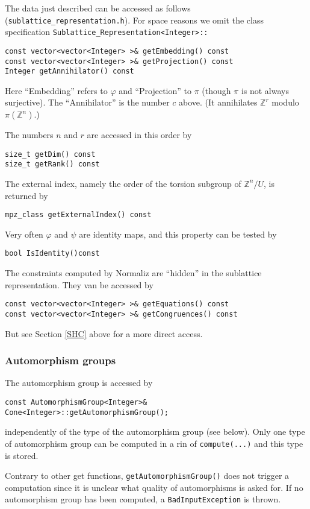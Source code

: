 \documentclass[12pt,a4paper]{scrartcl}
\theoremstyle{definition}
\let\phi=\varphi
\def\ZZ{{\mathbb Z}}
\begin{document}
\begin{small}
The data just described can be accessed as follows (\verb|sublattice_representation.h|). For space reasons we omit the class specification \verb|Sublattice_Representation<Integer>::|
\begin{Verbatim}
const vector<vector<Integer> >& getEmbedding() const
const vector<vector<Integer> >& getProjection() const
Integer getAnnihilator() const
\end{Verbatim}
Here ``Embedding'' refers to $\phi$ and ``Projection'' to $\pi$ (though $\pi$ is not always surjective). The ``Annihilator'' is the number $c$ above. (It annihilates $\ZZ^r$ modulo $\pi(\ZZ^n)$.)

The numbers $n$ and $r$ are accessed in this order by
\begin{Verbatim}
size_t getDim() const
size_t getRank() const
\end{Verbatim}
The external index, namely the order of the torsion subgroup of $\ZZ^n/U$, is returned by
\begin{Verbatim}
mpz_class getExternalIndex() const
\end{Verbatim}
Very often $\phi$ and $\psi$ are identity maps, and this property can be tested by
\begin{Verbatim}
bool IsIdentity()const
\end{Verbatim}
The constraints computed by Normaliz are ``hidden'' in the sublattice representation. They van be accessed by
\begin{Verbatim}
const vector<vector<Integer> >& getEquations() const
const vector<vector<Integer> >& getCongruences() const
\end{Verbatim}

But see Section \ref{SHC} above for a more direct access.

\subsubsection{Automorphism groups}

The automorphism group is accessed by

\begin{Verbatim}
const AutomorphismGroup<Integer>& Cone<Integer>::getAutomorphismGroup();
\end{Verbatim}
independently of the type of the automorphism group (see below). Only one type of automorphism group can be computed in a rin of \verb|compute(...)| and this type is stored.

Contrary to other get functions, \verb|getAutomorphismGroup()| does not trigger a computation since it is unclear what quality of automorphisms is asked for. If no automorphism group has been computed, a \verb|BadInputException| is thrown.


\end{small}
\end{document}
